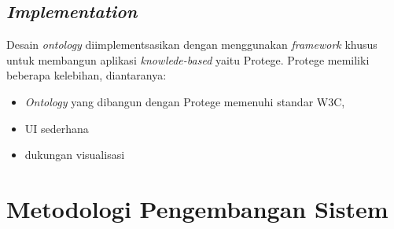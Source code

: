 \subsection{\textit{Implementation}}
\par
Desain \textit{ontology} diimplementsasikan dengan menggunakan \textit{framework} khusus untuk membangun aplikasi
\textit{knowlede-based} yaitu Protege. Protege memiliki beberapa kelebihan, diantaranya: 
\begin{itemize}
\item \textit{Ontology} yang dibangun dengan Protege memenuhi standar W3C,
\item UI sederhana
\item dukungan visualisasi
\end{itemize}

\section{Metodologi Pengembangan Sistem}


